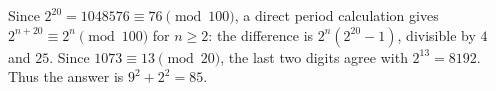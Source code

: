 Since $2^{20}=1048576\equiv76\pmod{100}$, a direct period calculation gives $2^{n+20}\equiv2^n\pmod{100}$ for $n\ge2$: the difference is $2^n(2^{20}-1)$, divisible by $4$ and $25$. Since $1073\equiv13\pmod{20}$, the last two digits agree with $2^{13}=8192$. Thus the answer is $9^2+2^2=\boxed{85}$.
